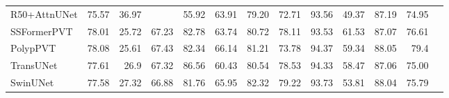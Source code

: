 \documentclass[10pt,twocolumn,letterpaper]{article}
\begin{document}
\begin{table*}[]
\begin{center}
{{\begin{tabular}{lrrrrrrrrrrrr}
\\
R50+AttnUNet \cite{chen2021transunet}                   & 75.57                    & 36.97                    &                                     & 55.92                                      & 63.91                                   & 79.20                                        & 72.71                                        & 93.56                                      & 49.37                                   & 87.19                                   & 74.95                                   
\\
SSFormerPVT \cite{wang2022stepwise}                   & 78.01                    & 25.72                    & 67.23                                     & 82.78                                      & 63.74                                   & 80.72                                        & 78.11                                        & 93.53                                      & 61.53                                   & 87.07                                   & 76.61                                   \\
PolypPVT \cite{dong2021polyp}                       & 78.08                    & 25.61                    & 67.43                           & 82.34                                      & 66.14                                   & 81.21                                        & 73.78                                        & 94.37                                      & 59.34                                   & 88.05                                   & 79.4                                    \\
TransUNet \cite{chen2021transunet}                     & 77.61                    & 26.9                     & 67.32                                  & 86.56                                      & 60.43                                   & 80.54                                        & 78.53                                        & 94.33                                      & 58.47                                   & 87.06                                   & 75.00                                      \\
SwinUNet \cite{cao2021swin}                      & 77.58                    & 27.32                    & 66.88                              & 81.76                                      & 65.95                                   & 82.32                                        & 79.22                                        & 93.73                                      & 53.81                                   & 88.04                                   & 75.79                                   \\

\end{tabular}}}
\end{center}
\end{table*}
\end{document}
